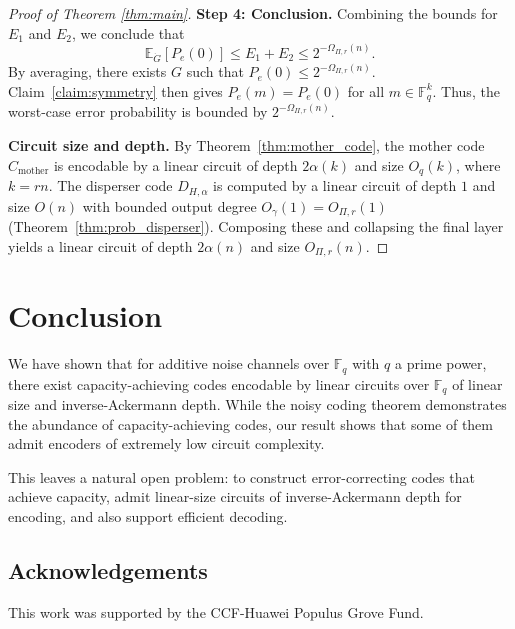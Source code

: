 \documentclass[11pt]{article}
\newcommand{\basecode}{C_{\text{mother}}}
\theoremstyle{named}
\begin{document}
\begin{proof}[Proof of Theorem \ref{thm:main}]
\noindent\textbf{Step 4: Conclusion.}  
Combining the bounds for $E_1$ and $E_2$, we conclude that
\[
\mathbb{E}_{\dot G}[P_e(0)] \le E_1 + E_2 \le 2^{- \Omega_{\Pi, r}(n)}.
\]
By averaging, there exists $G$ such that $P_e(0) \le 2^{-\Omega_{\Pi,r}(n)}$. 
Claim~\ref{claim:symmetry} then gives $P_e(m) = P_e(0)$ for all $m \in \mathbb{F}_q^k$. Thus, the worst-case error probability is bounded by $2^{-\Omega_{\Pi,r}(n)}$.

\textbf{Circuit size and depth.} By Theorem~\ref{thm:mother_code}, the mother code $\basecode$ is encodable by a linear circuit of depth $2\alpha(k)$ and size $O_q(k)$, where $k = rn$.
The disperser code $D_{H,\alpha}$ is computed by a linear circuit of depth $1$ and size $O(n)$ with bounded output degree $O_\gamma(1) = O_{\Pi,r}(1)$ (Theorem~\ref{thm:prob_disperser}). Composing these and collapsing the final layer yields a linear circuit of depth $2\alpha(n)$ and size $O_{\Pi,r}(n)$.

\end{proof}



\section{Conclusion}

We have shown that for additive noise channels over $\mathbb{F}_q$ with $q$ a prime power, there exist capacity-achieving codes encodable by linear circuits over $\mathbb{F}_q$ of linear size and inverse-Ackermann depth. 
While the noisy coding theorem demonstrates the abundance of capacity-achieving codes, our result shows that some of them admit encoders of extremely low circuit complexity.

This leaves a natural open problem: to construct error-correcting codes that achieve capacity, admit linear-size circuits of inverse-Ackermann depth for encoding, and also support efficient decoding.

\subsection*{Acknowledgements}

This work was supported by the CCF-Huawei Populus Grove Fund.




\printbibliography

\appendix
\end{document}
